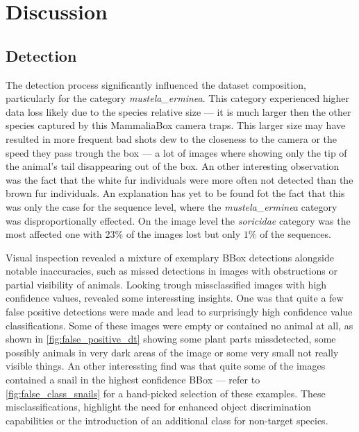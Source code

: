 


\section{Discussion}
\label{discussion}

\subsection{Detection}


The detection process significantly influenced the dataset composition, particularly for the category \textit{mustela\_erminea}.
This category experienced higher data loss likely due to the species relative size --- it is much larger then the other species captured by this MammaliaBox camera traps.
This larger size may have resulted in more frequent bad shots dew to the closeness to the camera or the speed they pass trough the box --- a lot of images where showing only the tip of the animal's tail disappearing out of the box.
An other interesting observation was the fact that the white fur individuals were more often not detected than the brown fur individuals.
An explanation has yet to be found fot the fact that this was only the case for the sequence level, where the \textit{mustela\_erminea} category was disproportionally effected.
On the image level the \textit{soricidae} category was the most affected one with \(23\%\) of the images lost but only \(1\%\) of the sequences.

Visual inspection revealed a mixture of exemplary BBox detections alongside notable inaccuracies, such as missed detections in images with obstructions or partial visibility of animals.
Looking trough missclassified images with high confidence values, revealed some interessting insights.
One was that quite a few false positive detections were made and lead to surprisingly high confidence value classifications.
Some of these images were empty or contained no animal at all, as shown in \autoref{fig:false_positive_dt} showing some plant parts missdetected, some possibly animals in very dark areas of the image or some very small not really visible things.
An other interessting find was that quite some of the images contained a snail in the highest confidence BBox --- refer to \autoref{fig:false_class_snails} for a hand-picked selection of these examples.
These misclassifications, highlight the need for enhanced object discrimination capabilities or the introduction of an additional class for non-target species.

